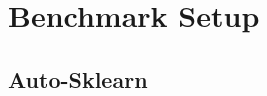 \chapter{Benchmark Setup}
\label{chapter:benchmark}

\section{Auto-Sklearn}
\label{section:auto-sklearn}
